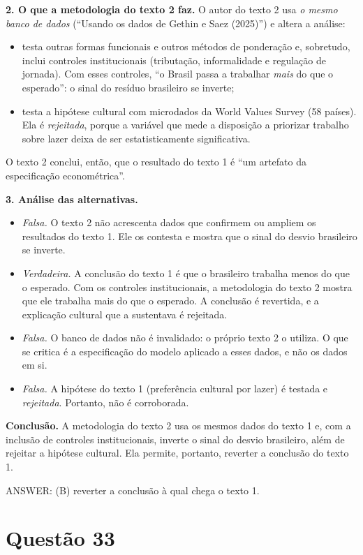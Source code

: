 \documentclass{article}%
\begin{document}
\textbf{2. O que a metodologia do texto 2 faz.} O autor do texto 2 usa \emph{o mesmo banco de dados} (``Usando os dados de Gethin e Saez (2025)'') e altera a análise:
\begin{itemize}
\item testa outras formas funcionais e outros métodos de ponderação e, sobretudo, inclui controles institucionais (tributação, informalidade e regulação de jornada). Com esses controles, ``o Brasil passa a trabalhar \emph{mais} do que o esperado'': o sinal do resíduo brasileiro se inverte;
\item testa a hipótese cultural com microdados da World Values Survey (58 países). Ela é \emph{rejeitada}, porque a variável que mede a disposição a priorizar trabalho sobre lazer deixa de ser estatisticamente significativa.
\end{itemize}
O texto 2 conclui, então, que o resultado do texto 1 é ``um artefato da especificação econométrica''.

\textbf{3. Análise das alternativas.}
\begin{itemize}
\item[a)] \emph{Falsa.} O texto 2 não acrescenta dados que confirmem ou ampliem os resultados do texto 1. Ele os contesta e mostra que o sinal do desvio brasileiro se inverte.
\item[b)] \emph{Verdadeira.} A conclusão do texto 1 é que o brasileiro trabalha menos do que o esperado. Com os controles institucionais, a metodologia do texto 2 mostra que ele trabalha mais do que o esperado. A conclusão é revertida, e a explicação cultural que a sustentava é rejeitada.
\item[c)] \emph{Falsa.} O banco de dados não é invalidado: o próprio texto 2 o utiliza. O que se critica é a especificação do modelo aplicado a esses dados, e não os dados em si.
\item[d)] \emph{Falsa.} A hipótese do texto 1 (preferência cultural por lazer) é testada e \emph{rejeitada}. Portanto, não é corroborada.
\end{itemize}

\textbf{Conclusão.} A metodologia do texto 2 usa os mesmos dados do texto 1 e, com a inclusão de controles institucionais, inverte o sinal do desvio brasileiro, além de rejeitar a hipótese cultural. Ela permite, portanto, reverter a conclusão do texto 1.

\medskip
ANSWER: (B) reverter a conclusão à qual chega o texto 1.%
\newpage%
\section*{Questão 33}
\end{document}
